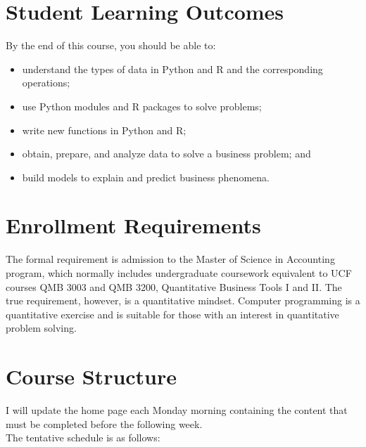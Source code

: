 \documentclass[11pt]{paper}
\begin{document}
\section*{Student Learning Outcomes}
By the end of this course, you should be able to:
\begin{itemize}
	\item	understand the types of data in Python and R and the corresponding operations;
  \item use Python modules and R packages to solve problems;
	\item write new functions in Python and R;
	\item obtain, prepare, and analyze data to solve a business problem; and
	\item build models to explain and predict business phenomena.
  
\end{itemize}

\section*{Enrollment Requirements}
The formal requirement is admission to the Master of Science in Accounting program, which normally includes undergraduate coursework equivalent to UCF courses QMB 3003 and QMB 3200, Quantitative Business Tools I and II. The true requirement, however, is a quantitative mindset. Computer programming is a quantitative exercise and is suitable for those with an interest in quantitative problem solving.

\section*{Course Structure}
I will update the home page each Monday morning containing the content that must be completed before the following week.\\

The tentative schedule is as follows:   
\end{document}
